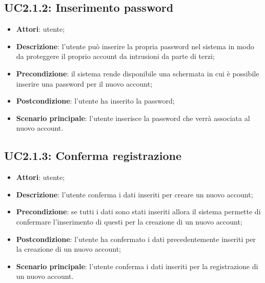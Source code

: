 \subsection{UC2.1.2: Inserimento password}
\label{UC2.1.2}
\begin{itemize}
\item \textbf{Attori}: utente;
\item \textbf{Descrizione}: l'utente può inserire la propria password nel sistema in modo da proteggere il proprio account da intrusioni da parte di terzi;
\item \textbf{Precondizione}: il sistema rende disponibile una schermata in cui è possibile inserire una password per il nuovo account;
\item \textbf{Postcondizione}: l'utente ha inserito la password;
\item \textbf{Scenario principale}:
l'utente inserisce la password che verrà associata al nuovo account.
\end{itemize}
\subsection{UC2.1.3: Conferma registrazione}
\label{UC2.1.3}
\begin{itemize}
\item \textbf{Attori}: utente;
\item \textbf{Descrizione}: l'utente conferma i dati inseriti per creare un nuovo account;
\item \textbf{Precondizione}: se tutti i dati sono stati inseriti allora il sistema permette di confermare l'inserimento di questi per la creazione di un nuovo account;
\item \textbf{Postcondizione}: l'utente ha confermato i dati precedentemente inseriti per la creazione di un nuovo account;
\item \textbf{Scenario principale}:
l'utente conferma i dati inseriti per la registrazione di un nuovo account.
\end{itemize}
